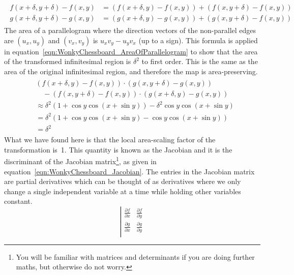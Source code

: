 \begin{parts}
\begin{solution}
		\begin{align}
			\begin{split}
				f(x + \delta, y + \delta) - f(x, y) &= (f(x + \delta, y) - f(x, y)) + (f(x, y + \delta) - f(x, y))  \\
				g(x + \delta, y + \delta) - g(x, y) &= (g(x + \delta, y) - g(x, y)) + (g(x, y + \delta) - f(x, y))
			\end{split}\label{eqn:WonkyChessboard_WhyTransformedInfinitesimalIsParallelogram}
		\end{align}
		The area of a parallelogram where the direction vectors of the non-parallel edges are $(u_x, u_y)$ and $(v_x, v_y)$ is $u_x v_y - u_y v_x$ (up to a sign). This formula is applied in equation~\eqref{eqn:WonkyChessboard_AreaOfParallelogram} to show that the area of the transformed infinitesimal region is $\delta^2$ to first order. This is the same as the area of the original infinitesimal region, and therefore the map is area-preserving.
		\begin{align}
			\begin{split}
				& (f(x + \delta, y) - f(x, y)) \cdot (g(x, y + \delta) - g(x, y)) \\
				&\quad - (f(x, y + \delta) - f(x, y)) \cdot (g(x + \delta, y) - g(x, y)) \\
				&\approx \delta^2 (1 + \cos y \cos(x + \sin y))
				- \delta^2 \cos y \cos(x + \sin y) \\
				&= \delta^2 (1 + \cos y \cos(x + \sin y)
				- \cos y \cos(x + \sin y)) \\
				&= \delta^2
			\end{split}\label{eqn:WonkyChessboard_AreaOfParallelogram}
		\end{align}
		What we have found here is that the local area-scaling factor of the transformation is~1. This quantity is known as the Jacobian and it is the discriminant of the Jacobian matrix\footnote{You will be familiar with matrices and determinants if you are doing further maths, but otherwise do not worry.}, as given in equation~\eqref{eqn:WonkyChessboard_Jacobian}. The entries in the Jacobian matrix are partial derivatives which can be thought of as derivatives where we only change a single independent variable at a time while holding other variables constant.
		\begin{equation}
			\left | \begin{array}{cc}
				\frac{\partial f}{\partial x} & \frac{\partial f}{\partial y}  \\
				\frac{\partial g}{\partial x} & \frac{\partial g}{\partial y}  \\

\end{array}
\end{equation}
\end{solution}
\end{parts}

